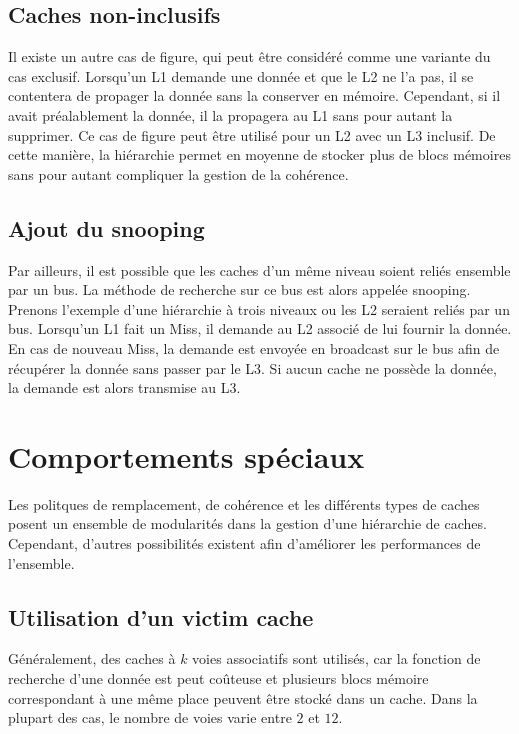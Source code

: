 \documentclass[a4paper]{article}
\begin{document}
\subsection{Caches non-inclusifs}
\indent Il existe un autre cas de figure, qui peut être considéré comme une variante du cas exclusif. Lorsqu'un L1 demande une donnée et que le L2 ne l'a pas, il se contentera de propager la donnée sans la conserver en mémoire. Cependant, si il avait préalablement la donnée, il la propagera au L1 sans pour autant la supprimer. Ce cas de figure peut être utilisé pour un L2 avec un L3 inclusif. De cette manière, la hiérarchie permet en moyenne de stocker plus de blocs mémoires sans pour autant compliquer la gestion de la cohérence.

\subsection{Ajout du snooping}
\indent Par ailleurs, il est possible que les caches d'un même niveau soient reliés ensemble par un bus. La méthode de recherche sur ce bus est alors appelée snooping. Prenons l'exemple d'une hiérarchie à trois niveaux ou les L2 seraient reliés par un bus. Lorsqu'un L1 fait un Miss, il demande au L2 associé de lui fournir la donnée. En cas de nouveau Miss, la demande est envoyée en broadcast sur le bus afin de récupérer la donnée sans passer par le L3. Si aucun cache ne possède la donnée, la demande est alors transmise au L3.

\newpage
\section{Comportements spéciaux}
\indent Les politques de remplacement, de cohérence et les différents types de caches posent un ensemble de modularités dans la gestion d'une hiérarchie de caches. Cependant, d'autres possibilités existent afin d'améliorer les performances de l'ensemble.

\subsection{Utilisation d'un victim cache}
\indent Généralement, des caches à $k$ voies associatifs sont utilisés, car la fonction de recherche d'une donnée est peut coûteuse et plusieurs blocs mémoire correspondant à une même place peuvent être stocké dans un cache. Dans la plupart des cas, le nombre de voies varie entre $2$ et $12$. \\
\end{document}
